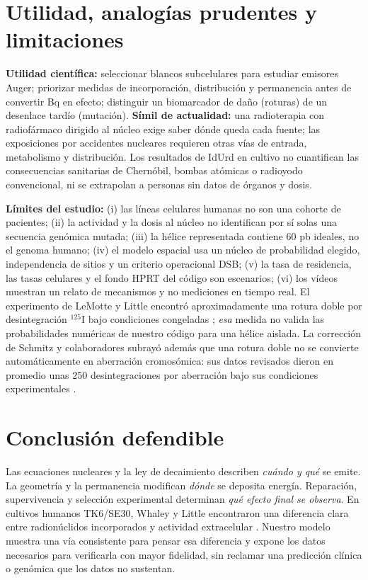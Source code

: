 \documentclass[11pt,a4paper]{article}
\begin{document}
\section{Utilidad, analogías prudentes y limitaciones}
\textbf{Utilidad científica:} seleccionar blancos subcelulares para estudiar emisores Auger; priorizar medidas de incorporación, distribución y permanencia antes de convertir Bq en efecto; distinguir un biomarcador de daño (roturas) de un desenlace tardío (mutación). \textbf{Símil de actualidad:} una radioterapia con radiofármaco dirigido al núcleo exige saber dónde queda cada fuente; las exposiciones por accidentes nucleares requieren otras vías de entrada, metabolismo y distribución. Los resultados de IdUrd en cultivo no cuantifican las consecuencias sanitarias de Chernóbil, bombas atómicas o radioyodo convencional, ni se extrapolan a personas sin datos de órganos y dosis.

\textbf{Límites del estudio:} (i) las líneas celulares humanas no son una cohorte de pacientes; (ii) la actividad y la dosis al núcleo no identifican por sí solas una secuencia genómica mutada; (iii) la hélice representada contiene 60 pb ideales, no el genoma humano; (iv) el modelo espacial usa un núcleo de probabilidad elegido, independencia de sitios y un criterio operacional DSB; (v) la tasa de residencia, las tasas celulares y el fondo HPRT del código son escenarios; (vi) los vídeos muestran un relato de mecanismos y no mediciones en tiempo real. El experimento de LeMotte y Little encontró aproximadamente una rotura doble por desintegración $^{125}$I bajo condiciones congeladas \cite{lemotte}; \emph{esa} medida no valida las probabilidades numéricas de nuestro código para una hélice aislada. La corrección de Schmitz y colaboradores subrayó además que una rotura doble no se convierte automáticamente en aberración cromosómica: sus datos revisados dieron en promedio unas 250 desintegraciones por aberración bajo sus condiciones experimentales \cite{corrigendum}.

\section{Conclusión defendible}
Las ecuaciones nucleares y la ley de decaimiento describen \emph{cuándo y qué} se emite. La geometría y la permanencia modifican \emph{dónde} se deposita energía. Reparación, supervivencia y selección experimental determinan \emph{qué efecto final se observa}. En cultivos humanos TK6/SE30, Whaley y Little encontraron una diferencia clara entre radionúclidos incorporados y actividad extracelular \cite{whaley}. Nuestro modelo muestra una vía consistente para pensar esa diferencia y expone los datos necesarios para verificarla con mayor fidelidad, sin reclamar una predicción clínica o genómica que los datos no sustentan.
\end{document}
